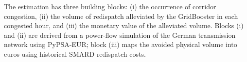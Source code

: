 The estimation has three building blocks: (i) the occurrence of corridor congestion, (ii) the volume of redispatch alleviated by the GridBooster in each congested hour, and (iii) the monetary value of the alleviated volume. Blocks (i) and (ii) are derived from a power-flow simulation of the German transmission network using PyPSA-EUR; block (iii) maps the avoided physical volume into euros using historical SMARD redispatch costs.




